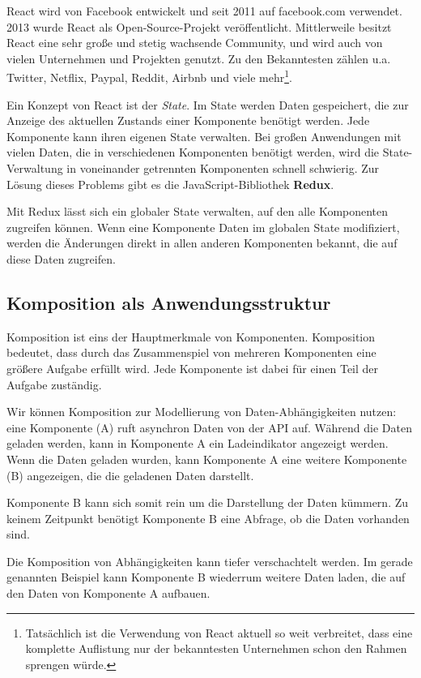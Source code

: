 React wird von Facebook entwickelt und seit 2011 auf facebook.com verwendet. 2013 wurde React als Open-Source-Projekt veröffentlicht. Mittlerweile besitzt React eine sehr große und stetig wachsende Community, und wird auch von vielen Unternehmen und Projekten genutzt. Zu den Bekanntesten zählen u.a. Twitter, Netflix, Paypal, Reddit, Airbnb und viele mehr\footnote{Tatsächlich ist die Verwendung von React aktuell so weit verbreitet, dass eine komplette Auflistung nur der bekanntesten Unternehmen schon den Rahmen sprengen würde.}.

Ein Konzept von React ist der \emph{State}. Im State werden Daten gespeichert, die zur Anzeige des aktuellen Zustands einer Komponente benötigt werden. Jede Komponente kann ihren eigenen State verwalten. Bei großen Anwendungen mit vielen Daten, die in verschiedenen Komponenten benötigt werden, wird die State-Verwaltung in voneinander getrennten Komponenten schnell schwierig. Zur Lösung dieses Problems gibt es die JavaScript-Bibliothek \textbf{Redux}.

Mit Redux lässt sich ein globaler State verwalten, auf den alle Komponenten zugreifen können. Wenn eine Komponente Daten im globalen State modifiziert, werden die Änderungen direkt in allen anderen Komponenten bekannt, die auf diese Daten zugreifen.

\subsection{Komposition als Anwendungsstruktur}
\label{subsec:komposition}

Komposition ist eins der Hauptmerkmale von Komponenten. Komposition bedeutet, dass durch das Zusammenspiel von mehreren Komponenten eine größere Aufgabe erfüllt wird. Jede Komponente ist dabei für einen Teil der Aufgabe zuständig. \citep[Kapitel 1]{Maemecke2017}

Wir können Komposition zur Modellierung von Daten-Abhängigkeiten nutzen: eine Komponente (A) ruft asynchron Daten von der \ac{API} auf. Während die Daten geladen werden, kann in Komponente A ein Ladeindikator angezeigt werden. Wenn die Daten geladen wurden, kann Komponente A eine weitere Komponente (B) angezeigen, die die geladenen Daten darstellt.

Komponente B kann sich somit rein um die Darstellung der Daten kümmern. Zu keinem Zeitpunkt benötigt Komponente B eine Abfrage, ob die Daten vorhanden sind.

Die Komposition von Abhängigkeiten kann tiefer verschachtelt werden. Im gerade genannten Beispiel kann Komponente B wiederrum weitere Daten laden, die auf den Daten von Komponente A aufbauen.


